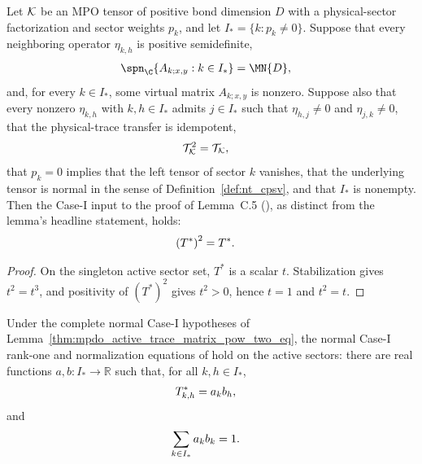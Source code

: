 \begin{lemma}[The Case-I relation $(T^*)^2=T^*$]
    \label{thm:mpdo_active_trace_matrix_pow_two_eq}
    \leanok
    Let ${\cal K}$ be an MPO tensor of positive bond dimension $D$ with a
    physical-sector factorization and sector weights $p_k$, and let
    $I_*=\{k:p_k\ne0\}$. Suppose that every neighboring operator
    $\eta_{k,h}$ is positive semidefinite,
    \begin{align}
        \spn_{\C}\{A_{k;x,y}:k\in I_*\} & =\MN{D},
        \notag
    \end{align}
    and, for every $k\in I_*$, some virtual matrix $A_{k;x,y}$ is nonzero.
    Suppose also that every nonzero $\eta_{k,h}$ with $k,h\in I_*$ admits
    $j\in I_*$ such that $\eta_{h,j}\ne0$ and $\eta_{j,k}\ne0$, that the
    physical-trace transfer is idempotent,
    \begin{align}
        \mathcal T_{\cal K}^2 & =\mathcal T_{\cal K},
        \notag
    \end{align}
    that $p_k=0$ implies that the left tensor of sector $k$ vanishes, that
    the underlying tensor is normal in the sense of
    Definition~\ref{def:nt_cpsv}, and that $I_*$ is nonempty. Then the
    Case-I input to the proof of Lemma~C.5
    (\cite[Appendix~C.2, lines~1473--1499]{Cirac2016MPDO_arXiv}), as
    distinct from the lemma's headline statement, holds:
    \begin{align}
        \left(T^*\right)^2 & =T^*.
        \notag
    \end{align}
\end{lemma}

\begin{proof}
    \leanok
    On the singleton active sector set, $T^*$ is a scalar $t$. Stabilization
    gives $t^2=t^3$, and positivity of $(T^*)^2$ gives $t^2>0$, hence
    $t=1$ and $t^2=t$.
\end{proof}

\begin{lemma}
    \label{thm:mpdo_casei_rank_one_coefficients}
    \leanok
    Under the complete normal Case-I hypotheses of
    Lemma~\ref{thm:mpdo_active_trace_matrix_pow_two_eq}, the normal Case-I
    rank-one and normalization equations of
    \cite[Appendix~C.2, lines~1394--1401 and 1484--1499]{Cirac2016MPDO_arXiv}
    hold on the active sectors: there are real functions
    $a,b:I_*\to\mathbb R$ such that, for all $k,h\in I_*$,
    \begin{align}
        T^*_{k,h} & =a_kb_h,
        \notag
    \end{align}
    and
    \begin{align}
        \sum_{k\in I_*}a_kb_k & =1.
        \notag
    \end{align}
\end{lemma}

